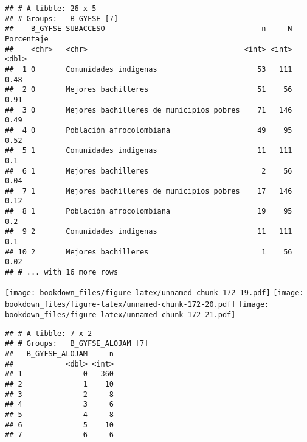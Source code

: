 \documentclass[]{article}
\theoremstyle{definition}
\theoremstyle{definition}
\theoremstyle{definition}
\theoremstyle{remark}
\begin{document}
\begin{verbatim}
## # A tibble: 26 x 5
## # Groups:   B_GYFSE [7]
##    B_GYFSE SUBACCESO                                    n     N Porcentaje
##    <chr>   <chr>                                    <int> <int>      <dbl>
##  1 0       Comunidades indígenas                       53   111       0.48
##  2 0       Mejores bachilleres                         51    56       0.91
##  3 0       Mejores bachilleres de municipios pobres    71   146       0.49
##  4 0       Población afrocolombiana                    49    95       0.52
##  5 1       Comunidades indígenas                       11   111       0.1 
##  6 1       Mejores bachilleres                          2    56       0.04
##  7 1       Mejores bachilleres de municipios pobres    17   146       0.12
##  8 1       Población afrocolombiana                    19    95       0.2 
##  9 2       Comunidades indígenas                       11   111       0.1 
## 10 2       Mejores bachilleres                          1    56       0.02
## # ... with 16 more rows
\end{verbatim}

\texttt{[image: bookdown\_files/figure-latex/unnamed-chunk-172-19.pdf]}
\texttt{[image: bookdown\_files/figure-latex/unnamed-chunk-172-20.pdf]}
\texttt{[image: bookdown\_files/figure-latex/unnamed-chunk-172-21.pdf]}

\begin{verbatim}
## # A tibble: 7 x 2
## # Groups:   B_GYFSE_ALOJAM [7]
##   B_GYFSE_ALOJAM     n
##            <dbl> <int>
## 1              0   360
## 2              1    10
## 3              2     8
## 4              3     6
## 5              4     8
## 6              5    10
## 7              6     6
\end{verbatim}
\end{document}
